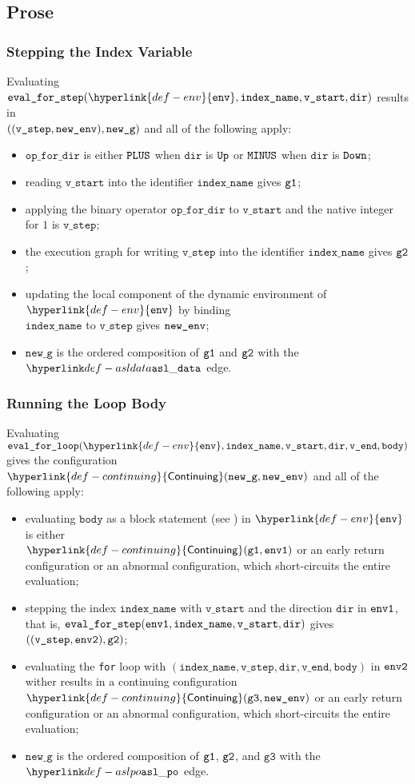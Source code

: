 \documentclass{book}
\newcommand\Continuing[0]{\hyperlink{def-continuing}{\textsf{Continuing}}}
\newcommand\env[0]{\hyperlink{def-env}{\texttt{env}}}
\newcommand\newg[0]{\texttt{new\_g}}
\newcommand\vgthree[0]{\texttt{g3}}
\newcommand\vstart[0]{\texttt{v\_start}}
\newcommand\vend[0]{\texttt{v\_end}}
\newcommand\vbody[0]{\texttt{body}}
\newcommand\dir[0]{\texttt{dir}}
\newcommand\vindexname[0]{\texttt{index\_name}}
\newcommand\evalforstep[0]{\texttt{eval\_for\_step}}
\newcommand\evalforloop[0]{\texttt{eval\_for\_loop}}
\newcommand\opfordir[0]{\texttt{op\_for\_dir}}
\newcommand\vstep[0]{\texttt{v\_step}}
\begin{document}
\subsection{Prose}
\subsubsection{Stepping the Index Variable}
Evaluating $\evalforstep(\env, \vindexname, \vstart, \dir)$ results in \\ $((\vstep, \newenv), \newg)$
and all of the following apply:
\begin{itemize}
  \item $\opfordir$ is either $\texttt{PLUS}$ when $\dir$ is $\texttt{Up}$ or $\texttt{MINUS}$ when $\dir$ is $\texttt{Down}$;
  \item reading $\vstart$ into the identifier $\vindexname$ gives $\texttt{g1}$;
  \item applying the binary operator $\opfordir$ to $\vstart$ and the native integer for $1$ is $\vstep$;
  \item the execution graph for writing $\vstep$ into the identifier $\vindexname$ gives $\texttt{g2}$;
  \item updating the local component of the dynamic environment of $\env$ by binding \\ $\vindexname$ to $\vstep$
  gives $\texttt{new\_env}$;
  \item $\newg$ is the ordered composition of $\texttt{g1}$ and $\texttt{g2}$ with the $\asldata$ edge.
\end{itemize}

\subsubsection{Running the Loop Body}
Evaluating $\evalforloop(\env, \vindexname, \vstart, \dir, \vend, \vbody)$ gives the configuration
$\Continuing(\newg, \newenv)$
and all of the following apply:
\begin{itemize}
  \item evaluating $\vbody$ as a block statement (see ) in $\env$
  is either \\ $\Continuing(\vgone, \envone)$ or an early return configuration or an abnormal configuration,
  which short-circuits the entire evaluation;
  \item stepping the index $\vindexname$ with $\vstart$ and the direction $\dir$ in $\texttt{env1}$,
  that is, $\evalforstep(\envone, \vindexname, \vstart, \dir)$ gives $((\vstep, \envtwo), \vgtwo)$;
  \item evaluating the \texttt{for} loop with $(\vindexname, \vstep, \dir, \vend, \vbody)$
  in $\texttt{env2}$ wither results in a continuing configuration $\Continuing(\vgthree, \newenv)$
  or an early return configuration
  or an abnormal configuration, which short-circuits the entire evaluation;
  \item $\newg$ is the ordered composition of $\texttt{g1}$, $\texttt{g2}$, and $\vgthree$ with the $\aslpo$
  edge.
\end{itemize}
\end{document}
